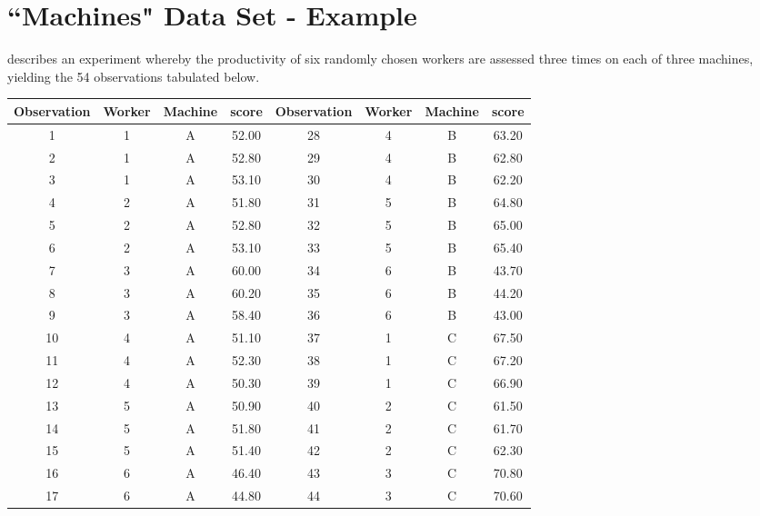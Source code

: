 \documentclass[main.tex]{subfiles}
\begin{document}


\section{``Machines" Data Set -  Example}

\citet{pb} describes an experiment whereby the productivity of six
randomly chosen workers are assessed three times on each of three
machines, yielding the 54 observations tabulated below.

\begin{table}[h!]
\begin{center}
\begin{tabular}{|c|c|c|c||c|c|c|c|}
  \hline
Observation & Worker & Machine & score & Observation & Worker & Machine & score \\
  \hline
1 & 1 & A & 52.00 &	28 & 4 & B & 63.20 \\
  2 & 1 & A & 52.80 &	  29 & 4 & B & 62.80 \\
  3 & 1 & A & 53.10 &	  30 & 4 & B & 62.20 \\
  4 & 2 & A & 51.80 &	  31 & 5 & B & 64.80 \\
  5 & 2 & A & 52.80 &	  32 & 5 & B & 65.00 \\
  6 & 2 & A & 53.10 &	  33 & 5 & B & 65.40 \\
  7 & 3 & A & 60.00 &	  34 & 6 & B & 43.70 \\
  8 & 3 & A & 60.20 &	  35 & 6 & B & 44.20 \\
  9 & 3 & A & 58.40 &	  36 & 6 & B & 43.00 \\
  10 & 4 & A & 51.10 &	  37 & 1 & C & 67.50 \\
  11 & 4 & A & 52.30 &	  38 & 1 & C & 67.20 \\
  12 & 4 & A & 50.30 &	  39 & 1 & C & 66.90 \\
  13 & 5 & A & 50.90 &	  40 & 2 & C & 61.50 \\
  14 & 5 & A & 51.80 &	  41 & 2 & C & 61.70 \\
  15 & 5 & A & 51.40 &	  42 & 2 & C & 62.30 \\
  16 & 6 & A & 46.40 &	  43 & 3 & C & 70.80 \\
  17 & 6 & A & 44.80 &	  44 & 3 & C & 70.60 \\

\end{tabular}
\end{center}
\end{table}
\end{document}
